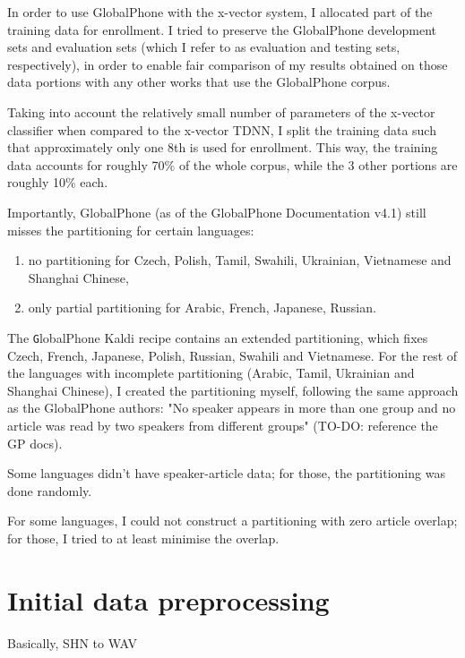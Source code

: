 \documentclass[bsc,frontabs,twoside,singlespacing,parskip,deptreport]{infthesis}
\begin{document}
{{    In order to use GlobalPhone with the x-vector system, I allocated part of the training data for enrollment. I tried to preserve the GlobalPhone development sets and evaluation sets (which I refer to as evaluation and testing sets, respectively), in order to enable fair comparison of my results obtained on those data portions with any other works that use the GlobalPhone corpus.

    Taking into account the relatively small number of parameters of the x-vector classifier when compared to the x-vector TDNN, I split the training data such that approximately only one 8th is used for enrollment. This way, the training data accounts for roughly 70\% of the whole corpus, while the 3 other portions are roughly 10\% each.

    Importantly, GlobalPhone (as of the GlobalPhone Documentation v4.1) still misses the partitioning for certain languages:
    \begin{enumerate}
      \item {no partitioning for Czech, Polish, Tamil, Swahili, Ukrainian, Vietnamese and Shanghai Chinese,}
      \item {only partial partitioning for Arabic, French, Japanese, Russian.}
    \end{enumerate}

    The {\texttt GlobalPhone} Kaldi recipe contains an extended partitioning, which fixes Czech, French, Japanese, Polish, Russian, Swahili and Vietnamese. For the rest of the languages with incomplete partitioning (Arabic, Tamil, Ukrainian and Shanghai Chinese), I created the partitioning myself, following the same approach as the GlobalPhone authors: "No speaker appears in more than one group and no article was read by two speakers from different groups" (TO-DO: reference the GP docs).

    Some languages didn't have speaker-article data; for those, the partitioning was done randomly.

    For some languages, I could not construct a partitioning with zero article overlap; for those, I tried to at least minimise the overlap.    
  }

  \section{Initial data preprocessing}{
    Basically, SHN to WAV

}}
\end{document}
